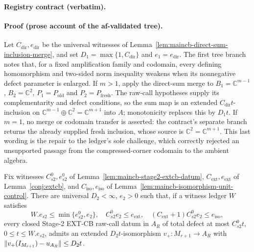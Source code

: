 \noindent\textbf{Registry contract (verbatim).}
\paragraph{Proof (prose account of the af-validated tree).}
Let $C_{\mathrm{dir}},e_{\mathrm{dir}}$ be the universal witnesses of
Lemma~\ref{lem:maincb-direct-sum-inclusion-merge}, and set
$D_1=\max\{1,C_{\mathrm{dir}}\}$ and $e_1=e_{\mathrm{dir}}$.  The first tree branch notes
that, for a fixed amplification family and codomain, every defining homomorphism and
two-sided norm inequality weakens when its nonnegative defect parameter is enlarged.
If $m>1$, apply the direct-sum merge to
$B_1=\mathbb C^{m-1}$, $B_2=\mathbb C^2$, $P_1=P_{\mathrm{old}}$ and
$P_2=P_{\mathrm{fresh}}$.  The raw-call hypotheses supply its complementarity and defect
conditions, so the sum map is an extended $C_{\mathrm{dir}}t$-inclusion on
$\mathbb C^{m-1}\oplus\mathbb C^2=\mathbb C^{m+1}$ into $A$; monotonicity replaces this
by $D_1t$.  If $m=1$, no merge or codomain transfer is asserted: the contract's separate
branch returns the already supplied fresh inclusion, whose source is
$\mathbb C^2=\mathbb C^{m+1}$.  This last wording is the repair to the ledger's sole
challenge, which correctly rejected an unsupported passage from the compressed-corner
codomain to the ambient algebra.
\begin{lemma}\label{lem:maincb-stage2-raw-extension}
Fix witnesses $C^0_{s2},e^0_{s2}$ of Lemma~\ref{lem:maincb-stage2-extcb-datum},
$C_{\mathrm{ext}},e_{\mathrm{ext}}$ of Lemma~\ref{conj:extcb}, and
$C_{\mathrm{iso}},e_{\mathrm{iso}}$ of Lemma~\ref{lem:maincb-isomorphism-unit-control}.
There are universal $D_2<\infty$, $e_2>0$ such that, if a witness ledger $W$ satisfies
\[
 W.e_{s2}\le\min\{e^0_{s2},e_2\},\quad C^0_{s2}e_2\le e_{\mathrm{ext}},\quad
 (C_{\mathrm{ext}}+1)C^0_{s2}e_2\le e_{\mathrm{iso}},
\]
every closed Stage-2 EXT-CB raw-call datum in $A_R$ of total defect at most $C^0_{s2}t$,
$0\le t\le W.e_{s2}$, admits an extended $D_2t$-isomorphism $v_+:M_{r+1}\to A_R$ with
$\lVert v_+(I_{M_{r+1}})-u_{A_R}\rVert\le D_2t$.
\end{lemma}
